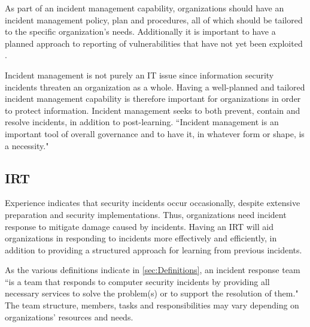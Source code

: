 As part of an incident management capability, organizations should have an incident management policy, plan and procedures, all of which should be tailored to the specific organization's needs. Additionally it is important to have a planned approach to reporting of vulnerabilities that have not yet been exploited \cite{ISO/IEC27035}.



Incident management is not purely an IT issue since information security incidents threaten an organization as a whole. Having a well-planned and tailored incident management capability is therefore important for organizations in order to protect information. Incident management seeks to both prevent, contain and resolve incidents, in addition to post-learning. ``Incident management is an important tool of overall governance and to have it, in whatever form or shape, is a necessity\cite{enisaGuide}." 

\subsection{\acl{IRT}}
Experience indicates that security incidents occur occasionally, despite extensive preparation and security implementations. Thus, organizations need incident response to mitigate damage caused by incidents. Having an \ac{IRT} will aid organizations in responding to incidents more effectively and efficiently, in addition to providing a structured approach for learning from previous incidents. 

As the various definitions indicate in \ref{sec:Definitions}, an incident response team ``is a team that responds to computer security incidents by providing all necessary services to solve the problem(s) or to support the resolution of them\cite{enisaCSIRTGoodPractices}." The team structure, members, tasks and responsibilities may vary depending on organizations' resources and needs. 

